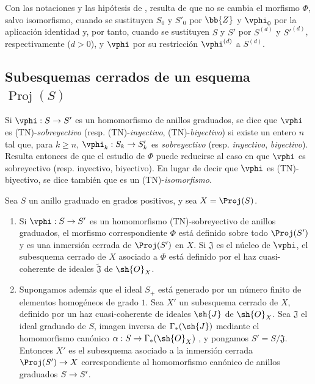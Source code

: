 \documentclass[oneside,10pt]{amsart}
\makeatletter
\renewcommand{\geq}{\geqslant}
\newcommand{\ega@arrow}[2]{\mathchoice{#1}{#2}{#2}{#2}}
\renewcommand{\to}{\ega@arrow{\longrightarrow}{\rightarrow}}
\newcommand{\oldpage}[2][]{\marginnote{\normalfont\footnotesize\textbf{#1}~|~#2}\ignorespaces}
\let\EGAOriginalLabel\label
\renewcommand{\label}[1]{\phantomsection\EGAOriginalLabel{#1}}
\makeatother
\begin{document}
\oldpage[II]{48}

\begin{env}[2.8.15]
\label{II.2.8.15}
Con las notaciones y las hipótesis de , resulta de  que no se cambia el morfismo $\Phi$, salvo isomorfismo, cuando se sustituyen $S_0$ y $S'_0$ por $\bb{Z}$ y $\vphi_0$ por la aplicación identidad y, por tanto, cuando se sustituyen $S$ y $S'$ por $S^{(d)}$ y ${S'}^{(d)}$, respectivamente ($d>0$), y $\vphi$ por su restricción $\vphi^{(d)}$ a $S^{(d)}$.
\end{env}

\subsection{Subesquemas cerrados de un esquema $\operatorname{Proj}(S)$}
\label{subsection:II.2.9}

\begin{env}[2.9.1]
\label{II.2.9.1}
Si $\vphi:S\to S'$ es un homomorfismo de anillos graduados, se dice que $\vphi$ es (TN)-\emph{sobreyectivo} (resp. (TN)-\emph{inyectivo}, (TN)-\emph{biyectivo}) si existe un entero $n$ tal que, para $k\geq n$, $\vphi_k:S_k\to S'_k$ es \emph{sobreyectivo} (resp. \emph{inyectivo}, \emph{biyectivo}).
Resulta entonces de  que el estudio de $\Phi$ puede reducirse al caso en que $\vphi$ es sobreyectivo (resp. inyectivo, biyectivo).
En lugar de decir que $\vphi$ es (TN)-biyectivo, se dice también que es un (TN)-\emph{isomorfismo}.
\end{env}

\begin{proposition}[2.9.2]
\label{II.2.9.2}
Sea $S$ un anillo graduado en grados positivos, y sea $X=\Proj(S)$.
\begin{enumerate}
  \item[{\rm(i)}] Si $\vphi:S\to S'$ es un homomorfismo \textup{(TN)}-sobreyectivo de anillos graduados, el morfismo correspondiente $\Phi$  está definido sobre todo $\Proj(S')$ y es una inmersión cerrada de $\Proj(S')$ en $X$.
    Si $\mathfrak{J}$ es el núcleo de $\vphi$, el subesquema cerrado de $X$ asociado a $\Phi$ está definido por el haz cuasi-coherente de ideales $\widetilde{\mathfrak{J}}$ de $\sh{O}_X$.
  \item[{\rm(ii)}] Supongamos además que el ideal $S_+$ está generado por un número finito de elementos homogéneos de grado $1$.
    Sea $X'$ un subesquema cerrado de $X$, definido por un haz cuasi-coherente de ideales $\sh{J}$ de $\sh{O}_X$.
    Sea $\mathfrak{J}$ el ideal graduado de $S$, imagen inversa de $\Gamma_*(\sh{J})$ mediante el homomorfismo canónico $\alpha:S\to\Gamma_*(\sh{O}_X)$ , y pongamos $S'=S/\mathfrak{J}$.
    Entonces $X'$ es el subesquema asociado a la inmersión cerrada $\Proj(S')\to X$ correspondiente al homomorfismo canónico de anillos graduados $S\to S'$.
\end{enumerate}
\end{proposition}
\end{document}

